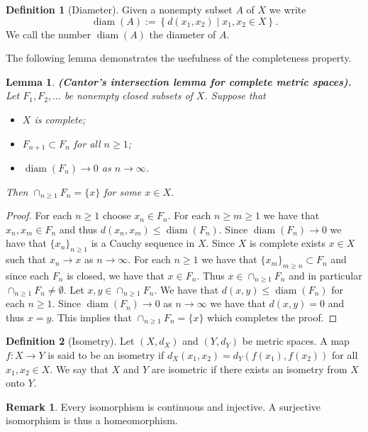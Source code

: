 \documentclass[11pt,a4paper]{article}
\theoremstyle{definition}
\newtheorem{definition}{Definition}[section]
\newtheorem{remark}{Remark}[section]
\theoremstyle{plain}
\newtheorem{lemma}[theorem]{Lemma}
\DeclareMathOperator{\diam}{diam}
\newcommand{\set}[2]{ \left\{ #1 \mid #2 \right\} }
\renewcommand{\tt}[1]{\textnormal{\textbf{(#1).}}} %
\begin{document}
  \begin{definition}[Diameter]
    Given a nonempty subset $A$ of $X$ we write
    \[
      \diam(A) := \set{d(x_1,x_2)}{x_1,x_2 \in X}.
    \]
    We call the number $\diam(A)$ the diameter of $A$.
  \end{definition}
  
  The following lemma demonstrates the usefulness of the completeness property.
  
  \begin{lemma}
    \tt{Cantor’s intersection lemma for complete metric spaces}
    Let $F_1,F_2,\dots$ be nonempty closed subsets of $X$. Suppose that
    \begin{itemize}
      \item $X$ is complete;
      \item $F_{n+1} \subset F_{n}$ for all $n \geq 1$;
      \item $\diam(F_n) \to 0$ as $n \to \infty$.
    \end{itemize}
    Then $\cap_{n \geq 1}{F_n} = \{x\}$ for some $x \in X$.
  \end{lemma}
  \begin{proof}
    For each $n \geq 1$ choose $x_n \in F_n$. For each $n \geq m \geq 1$
    we have that $x_n,x_m \in F_n$ and thus $d(x_n,x_m) \le \diam(F_n)$.
    Since $\diam(F_n) \to 0$ we have that $\{x_n\}_{n \geq 1}$ is a Cauchy
    sequence in $X$. Since $X$ is complete exists $x \in X$ such that 
    $x_n \to x$ as $n \to \infty$. For each $n \geq 1$ we have that 
    $\{x_m\}_{m \geq n} \subset F_n$ and since each $F_n$ is closed, we
    have that $x \in F_n$. Thus $x \in \cap_{n \geq 1}{F_n}$ and in 
    particular $\cap_{n \geq 1}{F_n} \neq \emptyset$. Let 
    $x,y \in \cap_{n \geq 1}{F_n}$. We have that $d(x,y) \le \diam(F_n)$
    for each $n \geq 1$. Since $\diam(F_n) \to 0$ as $n \to \infty$ we
    have that $d(x,y) = 0$ and thus $x=y$. This implies that
    $\cap_{n \geq 1}{F_n} = \{x\}$ which completes the proof.
  \end{proof}
  
  \begin{definition}[Isometry]
    Let $(X,d_X)$ and $(Y,d_Y)$ be metric spaces. A map $f \colon X \to Y$ 
    is said to be an isometry if $d_X(x_1,x_2) = d_Y(f(x_1),f(x_2))$ for all 
    $x_1,x_2 \in X$. We say that $X$ and $Y$ are isometric if there exists 
    an isometry from $X$ onto $Y$.
  \end{definition}
  
  \begin{remark}
    Every isomorphism is continuous and injective. A surjective isomorphism
    is thus a homeomorphism.
  \end{remark}
  
\end{document}
